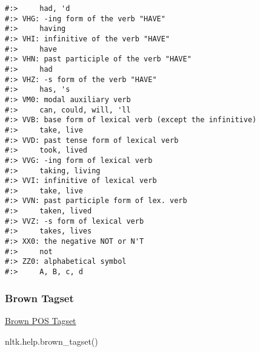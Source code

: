 \documentclass[
]{book}
\newenvironment{Shaded}{\begin{snugshade}}{\end{snugshade}}
\newcommand{\BuiltInTok}[1]{#1}
\newcommand{\NormalTok}[1]{#1}
\begin{document}
\begin{verbatim}
#:>     had, 'd
#:> VHG: -ing form of the verb "HAVE"
#:>     having
#:> VHI: infinitive of the verb "HAVE"
#:>     have
#:> VHN: past participle of the verb "HAVE"
#:>     had
#:> VHZ: -s form of the verb "HAVE"
#:>     has, 's
#:> VM0: modal auxiliary verb
#:>     can, could, will, 'll
#:> VVB: base form of lexical verb (except the infinitive)
#:>     take, live
#:> VVD: past tense form of lexical verb
#:>     took, lived
#:> VVG: -ing form of lexical verb
#:>     taking, living
#:> VVI: infinitive of lexical verb
#:>     take, live
#:> VVN: past participle form of lex. verb
#:>     taken, lived
#:> VVZ: -s form of lexical verb
#:>     takes, lives
#:> XX0: the negative NOT or N'T
#:>     not
#:> ZZ0: alphabetical symbol
#:>     A, B, c, d
\end{verbatim}

\hypertarget{brown-tagset}{%
\subsubsection{Brown Tagset}\label{brown-tagset}}

\href{https://en.wikipedia.org/wiki/Brown_Corpus\#Part-of-speech_tags_used}{Brown POS Tagset}

\begin{Shaded}
\begin{Highlighting}[]
\NormalTok{nltk.}\BuiltInTok{help}\NormalTok{.brown\_tagset()}
\end{Highlighting}
\end{Shaded}
\end{document}
